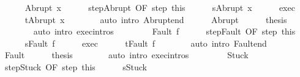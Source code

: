 \begin{isabellebody}
\isanewline
\ \ \ \ \isamarkupfalse%
\ {\isacharparenleft}Abrupt\ x{\isacharparenright}\isanewline
\ \ \ \ \isamarkupfalse%
\ step{\isacharunderscore}Abrupt\ {\isacharbrackleft}OF\ step\ this{\isacharbrackright}\isanewline
\ \ \ \ \isamarkupfalse%
\ {\isachardoublequoteopen}s{\isacharprime}{\isacharequal}Abrupt\ x{\isachardoublequoteclose}\isacommand{{\isachardot}}\isamarkupfalse%
\isanewline
\ \ \ \ \isamarkupfalse%
\ exec{\isacharprime}\isanewline
\ \ \ \ \isamarkupfalse%
\ {\isachardoublequoteopen}t{\isacharequal}Abrupt\ x{\isachardoublequoteclose}\isanewline
\ \ \ \ \ \ \isamarkupfalse%
\ {\isacharparenleft}auto\ intro{\isacharcolon}\ Abrupt{\isacharunderscore}end{\isacharparenright}\isanewline
\ \ \ \ \isamarkupfalse%
\ Abrupt\isanewline
\ \ \ \ \isamarkupfalse%
\ {\isacharquery}thesis\isanewline
\ \ \ \ \ \ \isamarkupfalse%
\ {\isacharparenleft}auto\ intro{\isacharcolon}\ exec{\isachardot}intros{\isacharparenright}\isanewline
\ \ \isamarkupfalse%
\isanewline
\ \ \ \ \isamarkupfalse%
\ {\isacharparenleft}Fault\ f{\isacharparenright}\isanewline
\ \ \ \ \isamarkupfalse%
\ step{\isacharunderscore}Fault\ {\isacharbrackleft}OF\ step\ this{\isacharbrackright}\isanewline
\ \ \ \ \isamarkupfalse%
\ {\isachardoublequoteopen}s{\isacharprime}{\isacharequal}Fault\ f{\isachardoublequoteclose}\isacommand{{\isachardot}}\isamarkupfalse%
\isanewline
\ \ \ \ \isamarkupfalse%
\ exec{\isacharprime}\isanewline
\ \ \ \ \isamarkupfalse%
\ {\isachardoublequoteopen}t{\isacharequal}Fault\ f{\isachardoublequoteclose}\isanewline
\ \ \ \ \ \ \isamarkupfalse%
\ {\isacharparenleft}auto\ intro{\isacharcolon}\ Fault{\isacharunderscore}end{\isacharparenright}\isanewline
\ \ \ \ \isamarkupfalse%
\ Fault\isanewline
\ \ \ \ \isamarkupfalse%
\ {\isacharquery}thesis\isanewline
\ \ \ \ \ \ \isamarkupfalse%
\ {\isacharparenleft}auto\ intro{\isacharcolon}\ exec{\isachardot}intros{\isacharparenright}\isanewline
\ \ \isamarkupfalse%
\isanewline
\ \ \ \ \isamarkupfalse%
\ Stuck\isanewline
\ \ \ \ \isamarkupfalse%
\ step{\isacharunderscore}Stuck\ {\isacharbrackleft}OF\ step\ this{\isacharbrackright}\isanewline
\ \ \ \ \isamarkupfalse%
\ {\isachardoublequoteopen}s{\isacharprime}{\isacharequal}Stuck{\isachardoublequoteclose}\isacommand{{\isachardot}}\isamarkupfalse%

\end{isabellebody}
